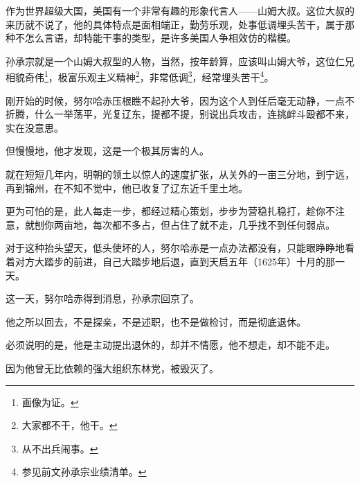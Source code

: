 \begin{multicols}{\theparacolNo}
作为世界超级大国，美国有一个非常有趣的形象代言人——山姆大叔。这位大叔的来历就不说了，他的具体特点是面相端正，勤劳乐观，处事低调埋头苦干，属于那种不怎么言语，却特能干事的类型，是许多美国人争相效仿的楷模。

孙承宗就是一个山姆大叔型的人物，当然，按年龄算，应该叫山姆大爷，这位仁兄相貌奇伟\footnote{画像为证。}，极富乐观主义精神\footnote{大家都不干，他干。}，非常低调\footnote{从不出兵闹事。}，经常埋头苦干\footnote{参见前文孙承宗业绩清单。}。

刚开始的时候，努尔哈赤压根瞧不起孙大爷，因为这个人到任后毫无动静，一点不折腾，什么一举荡平，光复辽东，提都不提，别说出兵攻击，连挑衅斗殴都不来，实在没意思。

但慢慢地，他才发现，这是一个极其厉害的人。

就在短短几年内，明朝的领土以惊人的速度扩张，从关外的一亩三分地，到宁远，再到锦州，在不知不觉中，他已收复了辽东近千里土地。

更为可怕的是，此人每走一步，都经过精心策划，步步为营稳扎稳打，趁你不注意，就刨你两亩地，每次都不多占，但占住了就不走，几乎找不到任何弱点。

对于这种抬头望天，低头使坏的人，努尔哈赤是一点办法都没有，只能眼睁睁地看着对方大踏步的前进，自己大踏步地后退，直到天启五年（1625年）十月的那一天。

这一天，努尔哈赤得到消息，孙承宗回京了。

他之所以回去，不是探亲，不是述职，也不是做检讨，而是彻底退休。

必须说明的是，他是主动提出退休的，却并不情愿，他不想走，却不能不走。

因为他曾无比依赖的强大组织东林党，被毁灭了。
\ifnum{}
	\end{multicols}
\fi
\newpage

